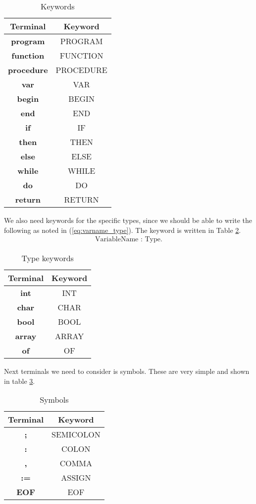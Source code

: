 \documentclass[10pt]{article}
\begin{document}
\begin{table}[h!]
\centering
\begin{tabular}{|c|c|}
\hline
Terminal & Keyword \\
\hline
\textbf{program} & PROGRAM \\
\textbf{function} & FUNCTION \\
\textbf{procedure} & PROCEDURE \\
\textbf{var} & VAR \\
\textbf{begin} & BEGIN \\
\textbf{end} & END \\
\textbf{if} & IF \\
\textbf{then} & THEN \\
\textbf{else} & ELSE \\
\textbf{while} & WHILE \\
\textbf{do} & DO \\
\textbf{return} & RETURN \\
\hline
\end{tabular}
\caption{\label{tab:keywords}Keywords}
\end{table}

We also need keywords for the specific types, since we should be able to write the following as noted in (\ref{eq:varname_type}). The keyword is written in Table \ref{tab:type_keywords}.
\begin{align}
\label{eq:varname_type}
\text{VariableName} \textbf{ : } \text{Type}. 
\end{align}

\begin{table}[h!]
\centering
\begin{tabular}{|c|c|}
\hline
Terminal & Keyword \\
\hline
\textbf{int} & INT \\
\textbf{char} & CHAR \\
\textbf{bool} & BOOL \\
\textbf{array} & ARRAY \\
\textbf{of} & OF \\
\hline
\end{tabular}
\caption{\label{tab:type_keywords}Type keywords}
\end{table}

Next terminals we need to consider is symbols. These are very simple and shown in table \ref{tab:symbols}.

\begin{table}[h!]
\centering
\begin{tabular}{|c|c|}
\hline
Terminal & Keyword \\
\hline
\textbf{;} & SEMICOLON \\
\textbf{:} & COLON \\
\textbf{,} & COMMA \\
\textbf{:=} & ASSIGN \\
\textbf{EOF} & EOF \\
\hline
\end{tabular}
\caption{\label{tab:symbols}Symbols}
\end{table}
\end{document}
